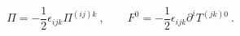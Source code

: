 \begin{equation}
\Pi =-\frac{1}{2}\epsilon _{ijk}\Pi ^{(ij)k}\ ,\qquad F^{0}=-\frac{1}{2}%
\epsilon _{ijk}\partial ^{i}T^{(jk)0}\ .
\end{equation}%
